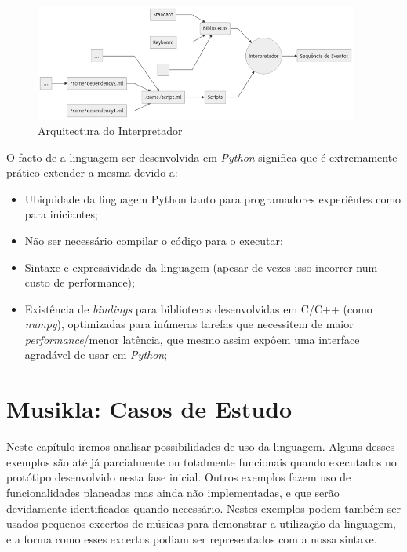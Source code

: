 \documentclass[
  oneside,
  11pt, a4paper,
  footinclude=true,
  headinclude=true,
  cleardoublepage=empty
]{scrbook}
\newcommand{\name}{Musikla}
\begin{document}
	
	\begin{figure}[h]
	\begin{center}
		\includegraphics[width=0.95\textwidth]{img/diagram_virtualmachine.png}
	\end{center}
	\caption{Arquitectura do Interpretador}
	\end{figure}
    O facto de a linguagem ser desenvolvida em \textit{Python} significa que é extremamente prático extender a mesma devido a:
    \begin{itemize}
     \item Ubiquidade da linguagem Python tanto para programadores experiêntes como para iniciantes;
     \item Não ser necessário compilar o código para o executar;
     \item Sintaxe e expressividade da linguagem (apesar de vezes isso incorrer num custo de performance);
     \item Existência de \textit{bindings} para bibliotecas desenvolvidas em C/C++ (como \textit{numpy}), optimizadas para inúmeras tarefas que necessitem de maior \textit{performance}/menor latência, que mesmo assim expôem uma interface agradável de usar em \textit{Python};
    \end{itemize}

    \chapter{\name: Casos de Estudo}
    Neste capítulo iremos analisar possibilidades de uso da linguagem. Alguns desses exemplos são até já parcialmente ou totalmente funcionais quando executados no protótipo desenvolvido nesta fase inicial. Outros exemplos fazem uso de funcionalidades planeadas mas ainda não implementadas, e que serão devidamente identificados quando necessário.
    Nestes exemplos podem também ser usados pequenos excertos de músicas para demonstrar a utilização da linguagem, e a forma como esses excertos podiam ser representados com a nossa sintaxe.
    
\end{document}
